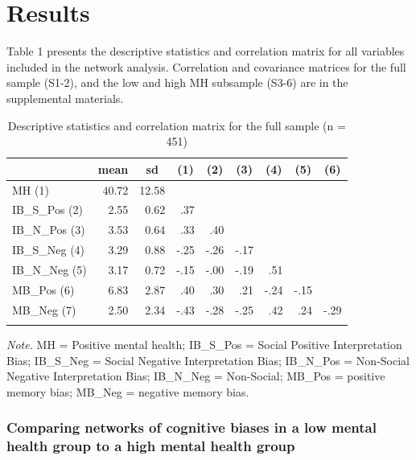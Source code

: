 \documentclass[man,floatsintext]{apa6}
\begin{document}
\hypertarget{results}{%
\section{Results}\label{results}}

Table 1 presents the descriptive statistics and correlation matrix for all variables included in the network analysis. Correlation and covariance matrices for the full sample (S1-2), and the low and high MH subsample (S3-6) are in the supplemental materials.

\begin{table}[tbp]
\begin{center}
\begin{threeparttable}
\caption{\label{tab:table1}Descriptive statistics and correlation matrix for the full sample (n = 451)}
\begin{tabular}{lrrrrrrrr}
\toprule
 & \multicolumn{1}{c}{mean} & \multicolumn{1}{c}{sd} & \multicolumn{1}{c}{(1)} & \multicolumn{1}{c}{(2)} & \multicolumn{1}{c}{(3)} & \multicolumn{1}{c}{(4)} & \multicolumn{1}{c}{(5)} & \multicolumn{1}{c}{(6)}\\
\midrule
MH (1) & 40.72 & 12.58 &  &  &  &  &  & \\
IB\_S\_Pos (2) & 2.55 & 0.62 & .37 &  &  &  &  & \\
IB\_N\_Pos (3) & 3.53 & 0.64 & .33 & .40 &  &  &  & \\
IB\_S\_Neg (4) & 3.29 & 0.88 & -.25 & -.26 & -.17 &  &  & \\
IB\_N\_Neg (5) & 3.17 & 0.72 & -.15 & -.00 & -.19 & .51 &  & \\
MB\_Pos (6) & 6.83 & 2.87 & .40 & .30 & .21 & -.24 & -.15 & \\
MB\_Neg (7) & 2.50 & 2.34 & -.43 & -.28 & -.25 & .42 & .24 & -.29\\
\bottomrule
\addlinespace
\end{tabular}
\begin{tablenotes}[para]
\normalsize{\textit{Note.} MH = Positive mental health; IB\_S\_Pos = Social Positive Interpretation Bias; IB\_S\_Neg = Social Negative Interpretation Bias; IB\_N\_Pos = Non-Social Negative Interpretation Bias; IB\_N\_Neg = Non-Social; MB\_Pos = positive memory bias; MB\_Neg = negative memory bias.}
\end{tablenotes}
\end{threeparttable}
\end{center}
\end{table}

\hypertarget{comparing-networks-of-cognitive-biases-in-a-low-mental-health-group-to-a-high-mental-health-group}{%
\subsubsection{Comparing networks of cognitive biases in a low mental health group to a high mental health group}\label{comparing-networks-of-cognitive-biases-in-a-low-mental-health-group-to-a-high-mental-health-group}}
\end{document}
